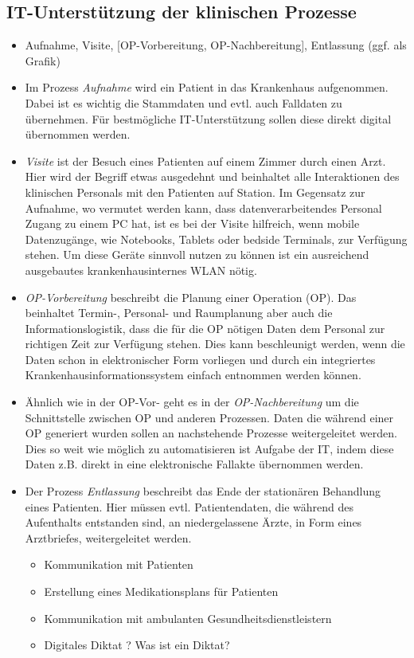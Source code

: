 \subsection{IT-Unterstützung der klinischen Prozesse}
	\begin{itemize}
		\item Aufnahme, Visite, [OP-Vorbereitung, OP-Nachbereitung], Entlassung (ggf. als Grafik) \parencite[37]{huebner2019}
		\item Im Prozess \textit{Aufnahme} wird ein Patient in das Krankenhaus aufgenommen. Dabei ist es wichtig die Stammdaten und evtl. auch Falldaten zu übernehmen. Für bestmögliche IT-Unterstützung sollen diese direkt digital übernommen werden. 
		\item \textit{Visite} ist der Besuch eines Patienten auf einem Zimmer durch einen Arzt. Hier wird der Begriff etwas ausgedehnt und beinhaltet alle Interaktionen des klinischen Personals mit den Patienten auf Station. Im Gegensatz zur Aufnahme, wo vermutet werden kann, dass datenverarbeitendes Personal Zugang zu einem PC hat, ist es bei der Visite hilfreich, wenn mobile Datenzugänge, wie Notebooks, Tablets oder bedside Terminals, zur Verfügung stehen. Um diese Geräte sinnvoll nutzen zu können ist ein ausreichend ausgebautes krankenhausinternes WLAN nötig.
		\item \textit{OP-Vorbereitung} beschreibt die Planung einer Operation (OP). Das beinhaltet Termin-, Personal- und Raumplanung aber auch die Informationslogistik, dass die für die OP nötigen Daten dem Personal zur richtigen Zeit zur Verfügung stehen. Dies kann beschleunigt werden, wenn die Daten schon in elektronischer Form vorliegen und durch ein integriertes Krankenhausinformationssystem einfach entnommen werden können.
		\item Ähnlich wie in der OP-Vor- geht es in der \textit{OP-Nachbereitung} um die Schnittstelle zwischen OP und anderen Prozessen. Daten die während einer OP generiert wurden sollen an nachstehende Prozesse weitergeleitet werden. Dies so weit wie möglich zu automatisieren ist Aufgabe der IT, indem diese Daten z.B. direkt in eine elektronische Fallakte übernommen werden.
		\item Der Prozess \textit{Entlassung} beschreibt das Ende der stationären Behandlung eines Patienten. Hier müssen evtl. Patientendaten, die während des Aufenthalts entstanden sind, an niedergelassene Ärzte, in Form eines Arztbriefes, weitergeleitet werden. 
		\begin{itemize}
			\item Kommunikation mit Patienten
			\item Erstellung eines Medikationsplans für Patienten
			\item Kommunikation mit ambulanten Gesundheitsdienstleistern
			\item Digitales Diktat ? Was ist ein Diktat?
		\end{itemize}
	\end{itemize}

